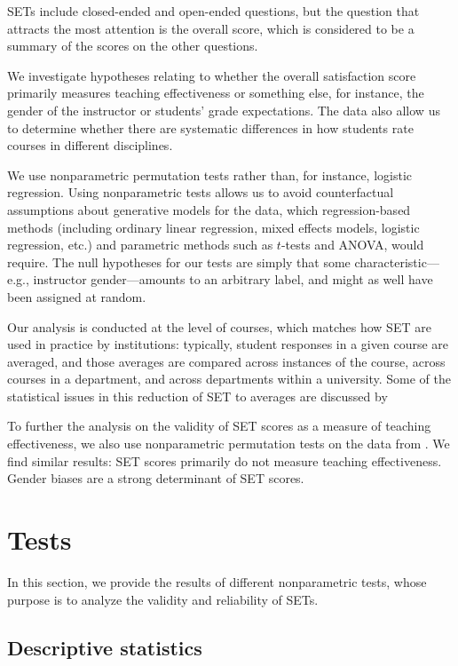 \documentclass[12pt]{article}
\begin{document}
SETs include closed-ended and open-ended questions, 
but the question that attracts the most attention is the overall 
score, which is considered to be a summary 
of the scores on the other questions. 

We investigate 
hypotheses relating to whether the overall satisfaction score  primarily measures teaching
effectiveness or something else, for instance, the gender of the instructor or students'
grade expectations.
The data also allow us to determine whether there are systematic differences
in how students rate courses in different disciplines.

We use nonparametric permutation tests rather than, for instance, logistic regression.
Using nonparametric tests allows us to avoid counterfactual assumptions about
generative models for the data, which regression-based methods (including
ordinary linear regression, mixed effects models, logistic regression, etc.) and parametric
methods such as $t$-tests and ANOVA, would require.
The null hypotheses for our tests are simply that some 
characteristic---e.g., instructor gender---amounts to an arbitrary label, and might as well
have been assigned at random. 

Our analysis is conducted at the level of courses, which matches how SET are
used in practice by institutions: typically, student responses in a given course
are averaged, and those averages are compared across instances of the course,
across courses in a department, and across departments within a university.
Some of the statistical issues in this reduction of SET to averages are 
discussed by \citet{Stark2014}

To further the analysis on the validity of SET scores as a measure of teaching effectiveness, we
also use nonparametric permutation tests on the data from \citet{MacNell2014}. We find similar results: 
SET scores primarily do not measure teaching effectiveness. Gender biases are a strong determinant of SET scores.


\section{Tests}
In this section, we provide the results of different nonparametric tests, whose purpose is to analyze the validity and reliability of SETs. 

\subsection{Descriptive statistics}
\end{document}
